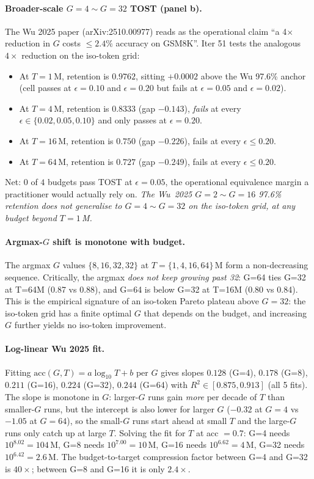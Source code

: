 \paragraph{Broader-scale $G{=}4 \sim G{=}32$ TOST (panel b).}
The Wu 2025 paper (arXiv:2510.00977) reads as the operational claim
``a 4$\times$ reduction in $G$ costs $\le 2.4\%$ accuracy on
GSM8K''.  Iter 51 tests the analogous $4\times$ reduction on the
iso-token grid:
\begin{itemize}
  \item At $T{=}1$\,M, retention is $0.9762$, sitting $+0.0002$ above
        the Wu 97.6\% anchor (cell passes at $\epsilon{=}0.10$ and
        $\epsilon{=}0.20$ but fails at $\epsilon{=}0.05$ and
        $\epsilon{=}0.02$).
  \item At $T{=}4$\,M, retention is $0.8333$ (gap $-0.143$),
        \emph{fails} at every $\epsilon \in \{0.02, 0.05, 0.10\}$
        and only passes at $\epsilon{=}0.20$.
  \item At $T{=}16$\,M, retention is $0.750$ (gap $-0.226$), fails
        at every $\epsilon\le 0.20$.
  \item At $T{=}64$\,M, retention is $0.727$ (gap $-0.249$), fails
        at every $\epsilon \le 0.20$.
\end{itemize}
Net: $0$ of $4$ budgets pass TOST at $\epsilon{=}0.05$, the
operational equivalence margin a practitioner would actually rely on.
\emph{The Wu~2025 $G{=}2 \sim G{=}16$ 97.6\% retention does not
generalise to $G{=}4 \sim G{=}32$ on the iso-token grid, at any
budget beyond $T{=}1$\,M.}

\paragraph{Argmax-$G$ shift is monotone with budget.}
The argmax $G$ values $\{8, 16, 32, 32\}$ at $T{=}\{1, 4, 16, 64\}$\,M
form a non-decreasing sequence.  Critically, the argmax \emph{does
not keep growing past 32}: G=64 ties G=32 at T=64M (0.87 vs 0.88), and
G=64 is below G=32 at T=16M (0.80 vs 0.84).  This is the empirical
signature of an iso-token Pareto plateau above $G{=}32$: the
iso-token grid has a finite optimal $G$ that depends on the budget,
and increasing $G$ further yields no iso-token improvement.

\paragraph{Log-linear Wu 2025 fit.}
Fitting $\text{acc}(G, T) = a \log_{10} T + b$ per $G$ gives slopes
$0.128$ (G=4), $0.178$ (G=8), $0.211$ (G=16), $0.224$ (G=32),
$0.244$ (G=64) with $R^2 \in [0.875, 0.913]$ (all 5 fits).  The slope
is monotone in $G$: larger-$G$ runs gain \emph{more} per decade of
$T$ than smaller-$G$ runs, but the intercept is also lower for
larger $G$ ($-0.32$ at $G{=}4$ vs $-1.05$ at $G{=}64$), so the small-$G$
runs start ahead at small $T$ and the large-$G$ runs only catch up
at large $T$.  Solving the fit for $T$ at acc $= 0.7$: G=4 needs
$10^{8.02} = 104$\,M, G=8 needs $10^{7.00} = 10$\,M, G=16 needs
$10^{6.62} = 4$\,M, G=32 needs $10^{6.42} = 2.6$\,M.  The
budget-to-target compression factor between G=4 and G=32 is $40\times$;
between G=8 and G=16 it is only $2.4\times$.

